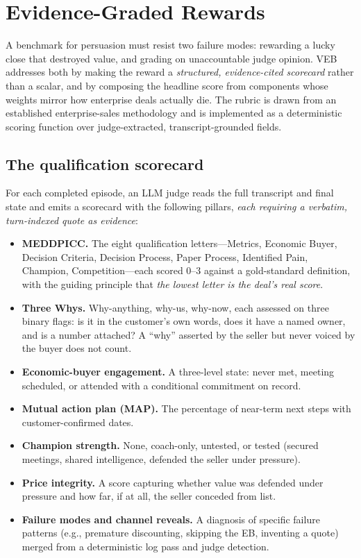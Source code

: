 \section{Evidence-Graded Rewards}
\label{sec:grading}

A benchmark for persuasion must resist two failure modes: rewarding a lucky close
that destroyed value, and grading on unaccountable judge opinion. VEB addresses
both by making the reward a \emph{structured, evidence-cited scorecard} rather
than a scalar, and by composing the headline score from components whose weights
mirror how enterprise deals actually die. The rubric is drawn from an established
enterprise-sales methodology and is implemented as a deterministic scoring
function over judge-extracted, transcript-grounded fields.

\subsection{The qualification scorecard}
For each completed episode, an LLM judge reads the full transcript and final state
and emits a scorecard with the following pillars, \emph{each requiring a verbatim,
turn-indexed quote as evidence}:

\begin{itemize}[leftmargin=1.4em,itemsep=2pt,topsep=2pt]
  \item \textbf{MEDDPICC.} The eight qualification letters---Metrics, Economic
  Buyer, Decision Criteria, Decision Process, Paper Process, Identified Pain,
  Champion, Competition---each scored $0$--$3$ against a gold-standard definition,
  with the guiding principle that \emph{the lowest letter is the deal's real
  score}.
  \item \textbf{Three Whys.} Why-anything, why-us, why-now, each assessed on three
  binary flags: is it in the customer's own words, does it have a named owner, and
  is a number attached? A ``why'' asserted by the seller but never voiced by the
  buyer does not count.
  \item \textbf{Economic-buyer engagement.} A three-level state: never met,
  meeting scheduled, or attended with a conditional commitment on record.
  \item \textbf{Mutual action plan (MAP).} The percentage of near-term next steps
  with customer-confirmed dates.
  \item \textbf{Champion strength.} None, coach-only, untested, or tested (secured
  meetings, shared intelligence, defended the seller under pressure).
  \item \textbf{Price integrity.} A score capturing whether value was defended
  under pressure and how far, if at all, the seller conceded from list.
  \item \textbf{Failure modes and channel reveals.} A diagnosis of specific
  failure patterns (e.g., premature discounting, skipping the EB, inventing a
  quote) merged from a deterministic log pass and judge detection.
\end{itemize}

